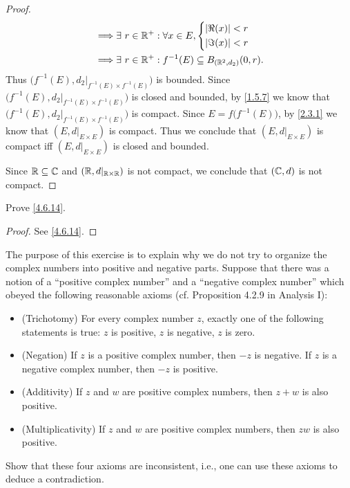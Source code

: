 \begin{proof}
\begin{align*}
    \implies & \exists\ r \in \mathbb{R}^+ : \forall x \in E, \begin{dcases}
                                                        \left\lvert\Re(x)\right\rvert < r \\
                                                        \left\lvert\Im(x)\right\rvert < r
                                                      \end{dcases}                                                                  \\
    \implies & \exists\ r \in \mathbb{R}^+ : f^{-1}(E) \subseteq B_{(\mathbb{R}^2, d_2)}(0, r).
  \end{align*}
  Thus \(\big(f^{-1}(E), d_2|_{f^{-1}(E) \times f^{-1}(E)}\big)\) is bounded.
  Since \(\big(f^{-1}(E), d_2|_{f^{-1}(E) \times f^{-1}(E)}\big)\) is closed and bounded, by \cref{1.5.7} we know that \(\big(f^{-1}(E), d_2|_{f^{-1}(E) \times f^{-1}(E)}\big)\) is compact.
  Since \(E = f\big(f^{-1}(E)\big)\), by \cref{2.3.1} we know that \((E, d|_{E \times E})\) is compact.
  Thus we conclude that \((E, d|_{E \times E})\) is compact iff \((E, d|_{E \times E})\) is closed and bounded.

  Since \(\mathbb{R} \subseteq \mathbb{C}\) and \((\mathbb{R}, d|_{\mathbb{R} \times \mathbb{R}})\) is not compact, we conclude that \((\mathbb{C}, d)\) is not compact.
\end{proof}

\begin{ex}\label{ex:4.6.14}
  Prove \cref{4.6.14}.
\end{ex}

\begin{proof}
  See \cref{4.6.14}.
\end{proof}

\begin{ex}\label{ex:4.6.15}
  The purpose of this exercise is to explain why we do not try to organize the complex numbers into positive and negative parts.
  Suppose that there was a notion of a ``positive complex number'' and a ``negative complex number'' which obeyed the following reasonable axioms (cf. Proposition 4.2.9 in Analysis I):
  \begin{itemize}
    \item (Trichotomy)
          For every complex number \(z\), exactly one of the following statements is true:
          \(z\) is positive, \(z\) is negative, \(z\) is zero.
    \item (Negation)
          If \(z\) is a positive complex number, then \(-z\) is negative.
          If \(z\) is a negative complex number, then \(-z\) is positive.
    \item (Additivity)
          If \(z\) and \(w\) are positive complex numbers, then \(z + w\) is also positive.
    \item (Multiplicativity)
          If \(z\) and \(w\) are positive complex numbers, then \(zw\) is also positive.
  \end{itemize}
  Show that these four axioms are inconsistent, i.e., one can use these axioms to deduce a contradiction.
\end{ex}


